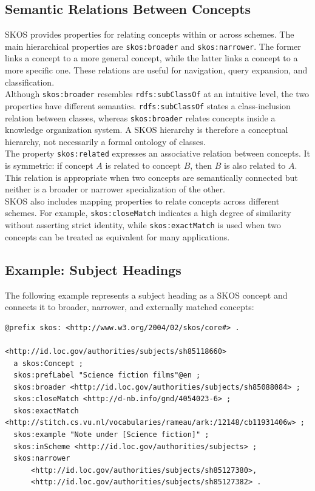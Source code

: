 \documentclass{scrbook}
\begin{document}
	\subsection{Semantic Relations Between Concepts}
	
	SKOS provides properties for relating concepts within or across schemes. The main hierarchical properties are \texttt{skos:broader} and \texttt{skos:narrower}. The former links a concept to a more general concept, while the latter links a concept to a more specific one. These relations are useful for navigation, query expansion, and classification.\\
	
	Although \texttt{skos:broader} resembles \texttt{rdfs:subClassOf} at an intuitive level, the two properties have different semantics. \texttt{rdfs:subClassOf} states a class-inclusion relation between classes, whereas \texttt{skos:broader} relates concepts inside a knowledge organization system. A SKOS hierarchy is therefore a conceptual hierarchy, not necessarily a formal ontology of classes.\\
	
	The property \texttt{skos:related} expresses an associative relation between concepts. It is symmetric: if concept \(A\) is related to concept \(B\), then \(B\) is also related to \(A\). This relation is appropriate when two concepts are semantically connected but neither is a broader or narrower specialization of the other.\\
	
	SKOS also includes mapping properties to relate concepts across different schemes. For example, \texttt{skos:closeMatch} indicates a high degree of similarity without asserting strict identity, while \texttt{skos:exactMatch} is used when two concepts can be treated as equivalent for many applications.
	
	\subsection{Example: Subject Headings}
	
	The following example represents a subject heading as a SKOS concept and connects it to broader, narrower, and externally matched concepts:
	
	\begin{lstlisting}
@prefix skos: <http://www.w3.org/2004/02/skos/core#> .
	
<http://id.loc.gov/authorities/subjects/sh85118660>
  a skos:Concept ;
  skos:prefLabel "Science fiction films"@en ;
  skos:broader <http://id.loc.gov/authorities/subjects/sh85088084> ;
  skos:closeMatch <http://d-nb.info/gnd/4054023-6> ;
  skos:exactMatch <http://stitch.cs.vu.nl/vocabularies/rameau/ark:/12148/cb11931406w> ;
  skos:example "Note under [Science fiction]" ;
  skos:inScheme <http://id.loc.gov/authorities/subjects> ;
  skos:narrower
      <http://id.loc.gov/authorities/subjects/sh85127380>,
      <http://id.loc.gov/authorities/subjects/sh85127382> .
	\end{lstlisting}
	
\end{document}
